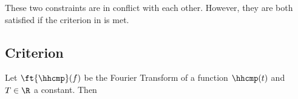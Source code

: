 These two constraints are in conflict with each other.
However, they are both satisfied if the criterion
in  is met.

\subsection{Criterion}
\begin{theorem}
\label{thm:db_zeroISI}
Let $\ft{\hhcmp}(f)$ be the Fourier Transform of a function
$\hhcmp(t)$ and $T\in\R$ a constant.
Then

\end{theorem}
